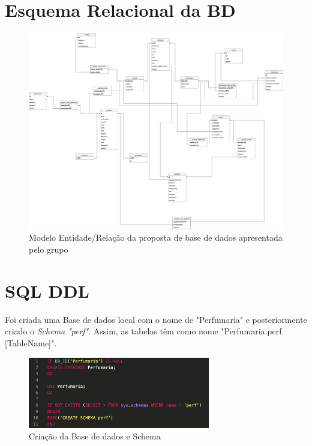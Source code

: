 \documentclass[10pt,portuguese]{article}
\begin{document}
\clearpage

\section{Esquema Relacional da BD}

\begin{figure}[!h]
    \centering
    \includegraphics[width=\textwidth]{images/ER.png}
    \caption{Modelo Entidade/Relação da proposta de base de dados apresentada pelo grupo}
\end{figure}

\clearpage

\section{SQL DDL}

\par Foi criada uma Base de dados local com o nome de "Perfumaria" e posteriormente criado o \textit{Schema} \textit{"perf"}. Assim, as tabelas têm como nome "Perfumaria.perf.[TableName]".

\begin{figure}[!h]
    \centering
    \includegraphics[width=300]{images/DDL_BD.png}
    \caption{Criação da Base de dados e Schema}
\end{figure}
\end{document}
